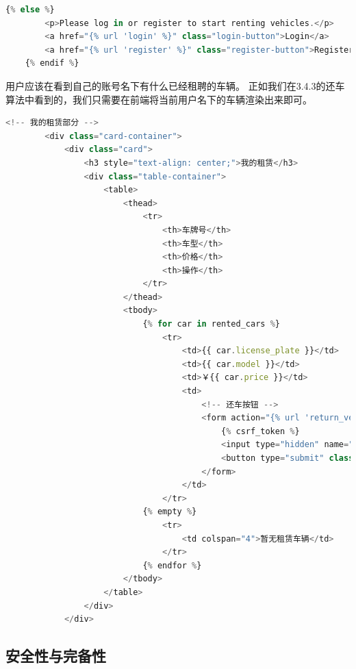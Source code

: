 \documentclass[UTF8,a4paper,12pt]{ctexart}
\begin{document}
\begin{lstlisting}[language=JavaScript]
    {% else %}
        <p>Please log in or register to start renting vehicles.</p>
        <a href="{% url 'login' %}" class="login-button">Login</a>
        <a href="{% url 'register' %}" class="register-button">Register</a>
    {% endif %}
\end{lstlisting}

用户应该在看到自己的账号名下有什么已经租聘的车辆。
正如我们在3.4.3的还车算法中看到的，我们只需要在前端将当前用户名下的车辆渲染出来即可。

\begin{lstlisting}[language=JavaScript]
    <!-- 我的租赁部分 -->
        <div class="card-container">
            <div class="card">
                <h3 style="text-align: center;">我的租赁</h3>
                <div class="table-container">
                    <table>
                        <thead>
                            <tr>
                                <th>车牌号</th>
                                <th>车型</th>
                                <th>价格</th>
                                <th>操作</th>
                            </tr>
                        </thead>
                        <tbody>
                            {% for car in rented_cars %}
                                <tr>
                                    <td>{{ car.license_plate }}</td>
                                    <td>{{ car.model }}</td>
                                    <td>￥{{ car.price }}</td>
                                    <td>
                                        <!-- 还车按钮 -->
                                        <form action="{% url 'return_vehicle' %}" method="POST" style="display:inline;">
                                            {% csrf_token %}
                                            <input type="hidden" name="vehicle_id" value="{{ car.license_plate }}">
                                            <button type="submit" class="btn-danger">还车</button>
                                        </form>
                                    </td>
                                </tr>
                            {% empty %}
                                <tr>
                                    <td colspan="4">暂无租赁车辆</td>
                                </tr>
                            {% endfor %}
                        </tbody>
                    </table>
                </div>
            </div>
\end{lstlisting}

\subsection{安全性与完备性}
\end{document}

